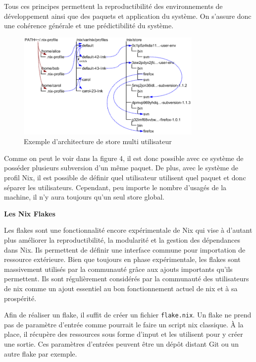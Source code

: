 \documentclass[a4paper,french,12pt, titlepage]{article}
\begin{document}
Tous ces principes permettent la reproductibilité des environnements de
développement ainsi que des paquets et application du système. On
s'assure donc une cohérence générale et une prédictibilité du
système.\newline

\begin{figure}[h]
\centering
\includegraphics[width=0.8\textwidth,height=0.8\textheight,keepaspectratio]{images/store.png}
\caption{Exemple d'architecture de store multi utilisateur}
\end{figure}

Comme on peut le voir dans la figure 4, il est donc possible avec ce
système de posséder plusieurs subversion d'un même paquet. De plus, avec
le système de profil Nix, il est possible de définir quel utilisateur
utilisent quel paquet et donc séparer les utilisateurs. Cependant, peu
importe le nombre d'usagés de la machine, il n'y aura toujours qu'un
seul store global.\newline

\textbf{Les Nix Flakes}\newline

Les flakes sont une fonctionnalité encore expérimentale de Nix qui vise
à d'autant plus améliorer la reproductibilité, la modularité et la
gestion des dépendances dans Nix. Ils permettent de définir une
interface commune pour importation de ressource extérieure. Bien que
toujours en phase expérimentale, les flakes sont massivement utilisés
par la communauté grâce aux ajouts importants qu'ils permettent. Ils
sont régulièrement considérés par la communauté des utilisateurs de nix
comme un ajout essentiel au bon fonctionnement actuel de nix et à sa
prospérité.\newline

Afin de réaliser un flake, il suffit de créer un fichier
\texttt{flake.nix}. Un flake ne prend pas de paramètre d'entrée comme
pourrait le faire un script nix classique. À la place, il récupère des
ressources sous forme d'input et les utilisent pour y créer une sortie.
Ces paramètres d'entrées peuvent être un dépôt distant Git ou un autre
flake par exemple.\newline
\end{document}

